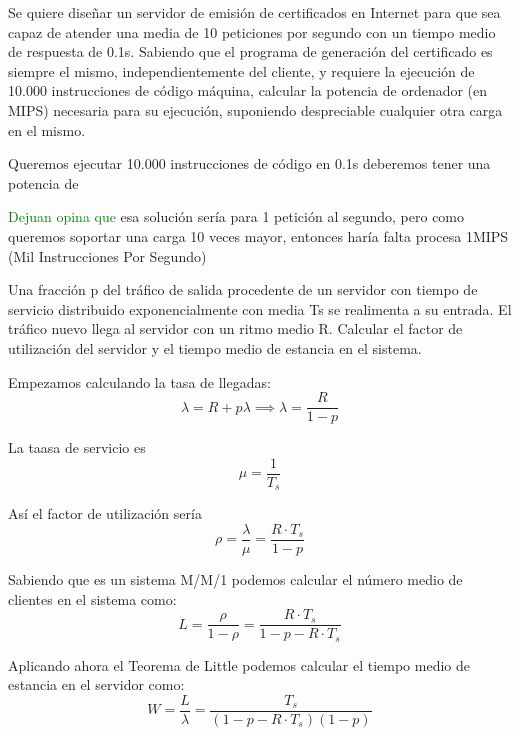 
\begin{problem}[4]
Se quiere diseñar un servidor de emisión de certificados en Internet para que sea capaz de atender una media de 10 peticiones por segundo con un tiempo medio de respuesta de 0.1s. Sabiendo que el programa de generación del certificado es siempre el mismo, independientemente del cliente, y requiere la ejecución de 10.000 instrucciones de código máquina, calcular la potencia de ordenador (en MIPS) necesaria para su ejecución,
suponiendo despreciable cualquier otra carga en el mismo.

\solution

\yoP


Queremos ejecutar 10.000 instrucciones de código en 0.1s deberemos tener una potencia de 

\textcolor{green}{Dejuan opina que} esa solución sería para 1 petición al segundo, pero como queremos soportar una carga 10 veces mayor, entonces haría falta procesa 1MIPS (Mil Instrucciones Por Segundo)
\end{problem}


\begin{problem}[5]
Una fracción p del tráfico de salida procedente de un servidor con tiempo de servicio distribuido exponencialmente con media Ts se realimenta a su entrada. El tráfico nuevo llega al servidor con un ritmo medio R. Calcular el factor de utilización del servidor y el tiempo medio de estancia en el
sistema.

\solution

\yoP


Empezamos calculando la tasa de llegadas:
\[λ = R + pλ \implies λ = \frac{R}{1-p}\]

La taasa de servicio es
\[μ= \frac{1}{T_s}\]

Así el factor de utilización sería
\[ρ=\frac{λ}{μ}=\boxed{\frac{R \cdot T_s}{1-p}}\]

Sabiendo que es un sistema M/M/1 podemos calcular el número medio de clientes en el sistema como:
\[L = \frac{ρ}{1-ρ}=\frac{R\cdot T_s}{1-p-R\cdot T_s}\]

Aplicando ahora el Teorema de Little podemos calcular el tiempo medio de estancia en el servidor como:
\[W = \frac{L}{λ}=\boxed{\frac{T_s}{(1-p-R\cdot T_s)(1-p)}}\]

\end{problem}


